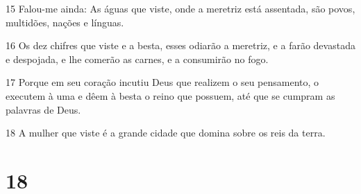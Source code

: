 \par 15 Falou-me ainda: As águas que viste, onde a meretriz está assentada, são povos, multidões, nações e línguas.
\par 16 Os dez chifres que viste e a besta, esses odiarão a meretriz, e a farão devastada e despojada, e lhe comerão as carnes, e a consumirão no fogo.
\par 17 Porque em seu coração incutiu Deus que realizem o seu pensamento, o executem à uma e dêem à besta o reino que possuem, até que se cumpram as palavras de Deus.
\par 18 A mulher que viste é a grande cidade que domina sobre os reis da terra.

\chapter{18}

